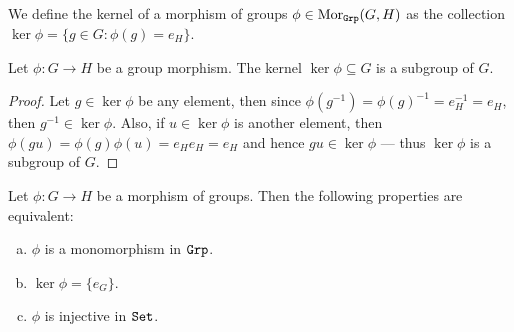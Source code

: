 \begin{definition}[Kernel]
    We define the kernel of a morphism of groups \(\phi \in \operatorname{Mor}_{\texttt{Grp}}(G, H)\) as
    the collection \(\ker \phi = \{g \in G \colon \phi(g) = e_H\}\).
\end{definition}

\begin{lemma}
    \label{lem:kernel-subgroup}
    Let \(\phi: G \to H\) be a group morphism. The kernel \(\ker \phi \subseteq G\)
    is a subgroup of \(G\).
\end{lemma}

\begin{proof}
    Let \(g \in \ker \phi\) be any element, then since \(\phi(g^{-1}) = \phi(g)^{-1}
    = e_H^{-1} = e_H\), then \(g^{-1} \in \ker \phi\). Also, if \(u \in \ker \phi\)
    is another element, then \(\phi(g u) = \phi(g) \phi(u) = e_H e_H = e_H\) and
    hence \(g u \in \ker \phi\) --- thus \(\ker \phi\) is a subgroup of \(G\).
\end{proof}

\begin{proposition}
    \label{prop:monic-in-grp}
    Let \(\phi: G \to H\) be a morphism of groups. Then the following properties are
    equivalent:
    \begin{enumerate}[(a)]\setlength\itemsep{0em}
        \item \(\phi\) is a monomorphism in \({\texttt{Grp}}\).

        \item \(\ker \phi = \{e_G\}\).

        \item \(\phi\) is injective in \({\texttt{Set}}\).
    \end{enumerate}
\end{proposition}


